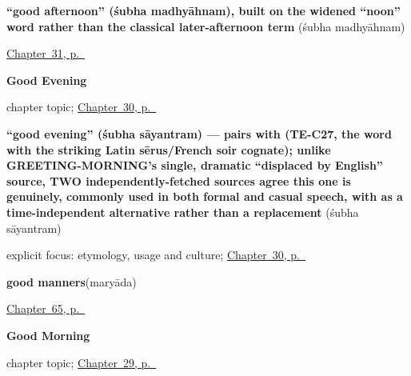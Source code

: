 \noindent\begin{minipage}[t]{\linewidth}
\raggedright
\textbf{\textquotedblleft{}good afternoon\textquotedblright{} (śubha madhyāhnam), built on the widened \textquotedblleft{}noon\textquotedblright{} word rather than the classical later-afternoon term}\enspace\emph{ }\enspace(śubha madhyāhnam)\par
\footnotesize \hyperref[ch:te-good-afternoon]{Chapter~31, p.~\pageref*{ch:te-good-afternoon}}
\end{minipage}\par\smallskip

\noindent\begin{minipage}[t]{\linewidth}
\raggedright
\textbf{Good Evening}\par
\footnotesize chapter topic; \hyperref[ch:te-good-evening]{Chapter~30, p.~\pageref*{ch:te-good-evening}}
\end{minipage}\par\smallskip

\noindent\begin{minipage}[t]{\linewidth}
\raggedright
\textbf{\textquotedblleft{}good evening\textquotedblright{} (śubha sāyantram) — pairs with  (TE-C27, the word with the striking Latin sērus/French soir cognate); unlike GREETING-MORNING's single, dramatic \textquotedblleft{}displaced by English\textquotedblright{} source, TWO independently-fetched sources agree this one is genuinely, commonly used in both formal and casual speech, with  as a time-independent alternative rather than a replacement}\enspace\emph{ }\enspace(śubha sāyantram)\par
\footnotesize explicit focus: etymology, usage and culture; \hyperref[ch:te-good-evening]{Chapter~30, p.~\pageref*{ch:te-good-evening}}
\end{minipage}\par\smallskip

\noindent\begin{minipage}[t]{\linewidth}
\raggedright
\textbf{good manners}\enspace\emph{}\enspace(maryāda)\par
\footnotesize \hyperref[ch:te-more-manners]{Chapter~65, p.~\pageref*{ch:te-more-manners}}
\end{minipage}\par\smallskip

\noindent\begin{minipage}[t]{\linewidth}
\raggedright
\textbf{Good Morning}\par
\footnotesize chapter topic; \hyperref[ch:te-good-morning]{Chapter~29, p.~\pageref*{ch:te-good-morning}}
\end{minipage}\par\smallskip

